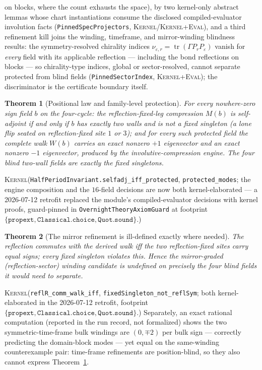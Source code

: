 \documentclass[11pt]{article}
\newcommand{\Kernel}{\textcolor{kernelcolor}{\textsc{Kernel}}}
\newcommand{\DraftTrust}{\textcolor{draftcolor}{\textsc{Kernel+Eval}}}
\newtheorem{theorem}{Theorem}
\begin{document}
on blocks, where the count exhausts the space), by two kernel-only
abstract lemmas whose chart instantiations consume the disclosed
compiled-evaluator involution facts
(\texttt{PinnedSpecProjectors}, \Kernel{}/\DraftTrust{}), and a third
refinement kill joins the
winding, timeframe, and mirror-winding blindness results: the
symmetry-resolved chirality indices
$\nu_{\varepsilon,r}=\operatorname{tr}(\Gamma P_r P_\varepsilon)$ vanish
for \emph{every} field with its applicable reflection --- including the
bond reflections on blocks --- so chirality-type indices, global or
sector-resolved, cannot separate protected from blind fields
(\texttt{PinnedSectorIndex}, \DraftTrust{}); the discriminator is the
certificate boundary itself.

\begin{theorem}[Positional law and family-level protection]\label{thm:law}
For every nowhere-zero sign field $b$ on the four-cycle: the
reflection-fixed-leg compression $M(b)$ is self-adjoint if and only if $b$
has exactly two walls and is not a fixed singleton (a lone flip seated on
reflection-fixed site $1$ or $3$); and for every such protected field the
\emph{complete} walk $W(b)$ carries an exact nonzero $+1$ eigenvector and
an exact nonzero $-1$ eigenvector, produced by the involutive-compression
engine.  The four blind two-wall fields are exactly the fixed singletons.
\end{theorem}
\noindent\Kernel{}\quad(\texttt{HalfPeriodInvariant.selfadj\_iff\_protected},
\texttt{protected\_modes}; the engine composition and the $16$-field decisions
are now both kernel-elaborated --- a 2026-07-12 retrofit replaced the module's
compiled-evaluator decisions with kernel proofs, guard-pinned in
\texttt{OvernightTheoryAxiomGuard} at footprint
$\{\texttt{propext},\texttt{Classical.choice},\texttt{Quot.sound}\}$.)

\begin{theorem}[The mirror refinement is ill-defined exactly where needed]
\label{thm:mirror}
The reflection commutes with the derived walk iff the two reflection-fixed
sites carry equal signs; every fixed singleton violates this.  Hence the
mirror-graded (reflection-sector) winding candidate is undefined on
precisely the four blind fields it would need to separate.
\end{theorem}
\noindent\Kernel{}\quad(\texttt{reflR\_comm\_walk\_iff},
\texttt{fixedSingleton\_not\_reflSym}; both kernel-elaborated in the 2026-07-12
retrofit, footprint $\{\texttt{propext},\texttt{Classical.choice},\texttt{Quot.sound}\}$.)
Separately, an exact
rational computation (reported in the run record, not formalized) shows the
two symmetric-time-frame bulk windings are $(0,\mp2)$ per bulk sign ---
correctly predicting the domain-block modes --- yet equal on the
same-winding counterexample pair: time-frame refinements are
position-blind, so they also cannot express Theorem~\ref{thm:law}.
\end{document}
